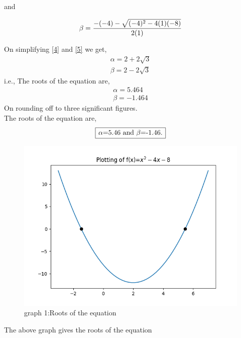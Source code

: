 \documentclass[journal,12pt,twocolumn]{IEEEtran}
\begin{document}
and

\begin{align} \label{5}
\beta =\Large \frac{-(-4)-\sqrt{(-4)^2-4(1)(-8)}}{2(1)}
\end{align}

On simplifying \eqref{4} and \eqref{5} we get,
\begin{align*}
\alpha=2+2\sqrt{3}  \\ \beta=2-2\sqrt{3} 
\end{align*}
i.e., The roots of the equation are,
\begin{align*}
\alpha=5.464   \\ \beta=-1.464
\end{align*}
On rounding off to three significant figures.
\\The roots of the equation are,
\begin{align*} 
\framebox[1.1\width]{$\alpha$=5.46 and $\beta$=-1.46.}
\end{align*}
\begin{figure}[h] 
\includegraphics[width=\columnwidth] 
{Figure_1}
\caption{graph 1:Roots of the equation}
\label{fig:a}
\end{figure}

\noindent The above graph \pageref{fig:a}   gives the roots of the equation 
\end{document}
